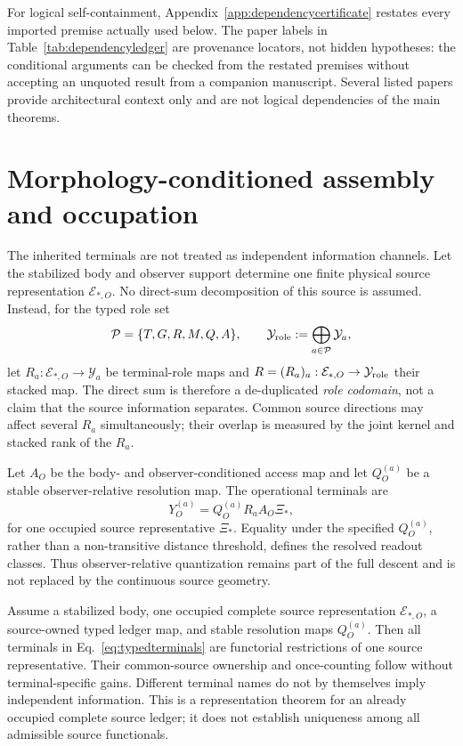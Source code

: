 For logical self-containment, Appendix~\ref{app:dependencycertificate}
restates every imported premise actually used below.  The paper labels in
Table~\ref{tab:dependencyledger} are provenance locators, not hidden
hypotheses: the conditional
arguments can be checked from the restated premises without accepting an
unquoted result from a companion manuscript.  Several listed papers provide
architectural context only and are not logical dependencies of the main
theorems.

\section{Morphology-conditioned assembly and occupation}

The inherited terminals are not treated as independent information channels.
Let the stabilized body and observer support determine one finite physical
source representation $\mathcal E_{*,O}$.  No direct-sum decomposition of
this source is assumed.  Instead, for the typed role set
\begin{equation}
\mathcal P=\{T,G,R,M,Q,A\},
\qquad
\mathcal Y_{\rm role}:=\bigoplus_{a\in\mathcal P}\mathcal Y_a,
\label{eq:rolecodomain}
\end{equation}
let $R_a:\mathcal E_{*,O}\to\mathcal Y_a$ be terminal-role maps and
$R=(R_a)_a:\mathcal E_{*,O}\to\mathcal Y_{\rm role}$ their stacked map.
The direct sum is therefore a de-duplicated \emph{role codomain}, not a claim
that the source information separates.  Common source directions may affect
several $R_a$ simultaneously; their overlap is measured by the joint kernel
and stacked rank of the $R_a$.

Let $A_O$ be the body- and observer-conditioned access map and let
$Q_O^{(a)}$ be a stable observer-relative resolution map.  The operational
terminals are
\begin{equation}
Y_O^{(a)}=Q_O^{(a)}R_a A_O\Xi_*,
\label{eq:typedterminals}
\end{equation}
for one occupied source representative $\Xi_*$.  Equality under the specified
$Q_O^{(a)}$, rather than a non-transitive distance threshold, defines the
resolved readout classes.  Thus observer-relative quantization remains part
of the full descent and is not replaced by the continuous source geometry.

\begin{proposition}
\label{prop:moprassembly}
Assume a stabilized body, one occupied complete source representation
$\mathcal E_{*,O}$, a source-owned typed ledger map, and stable resolution
maps $Q_O^{(a)}$.  Then all terminals in Eq.~\eqref{eq:typedterminals} are
functorial restrictions of one source representative.  Their common-source
ownership and once-counting follow without terminal-specific gains.  Different
terminal names do not by themselves imply independent information.  This is
a representation theorem for an already occupied complete source ledger; it
does not establish uniqueness among all admissible source functionals.
\end{proposition}

